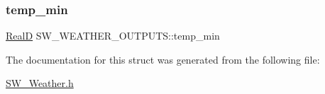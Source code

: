 \mbox{\label{struct_s_w___w_e_a_t_h_e_r___o_u_t_p_u_t_s_adb824c9208853bdc6bc1dfeff9abf96f}} 
\subsubsection{\texorpdfstring{temp\+\_\+min}{temp\_min}}
{\footnotesize\ttfamily \hyperlink{generic_8h_af1c105fd5732f70b91ddaeda0cc340e3}{RealD} S\+W\+\_\+\+W\+E\+A\+T\+H\+E\+R\+\_\+\+O\+U\+T\+P\+U\+T\+S\+::temp\+\_\+min}



The documentation for this struct was generated from the following file\+:\begin{DoxyCompactItemize}
\item 
\hyperlink{_s_w___weather_8h}{S\+W\+\_\+\+Weather.\+h}\end{DoxyCompactItemize}
